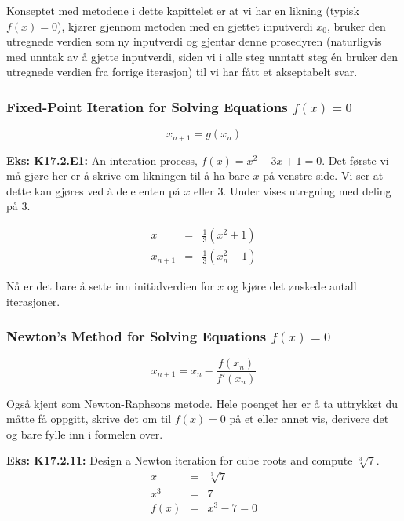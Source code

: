 \documentclass[norsk, a4paper, 12pt, titlepage]{article}
\begin{document}
Konseptet med metodene i dette kapittelet er at vi har en likning
(typisk $f(x) = 0$), kjører gjennom metoden med en gjettet inputverdi
$x_{0}$, bruker den utregnede verdien som ny inputverdi og gjentar
denne prosedyren (naturligvis med unntak av å gjette inputverdi, siden
vi i alle steg unntatt steg én bruker den utregnede verdien fra
forrige iterasjon) til vi har fått et akseptabelt svar.


\subsubsection{Fixed-Point Iteration for Solving Equations $f(x) = 0$}

\begin{equation}
x_{n+1} = g(x_{n})
\end{equation}

\textbf{Eks: K17.2.E1:} An interation process, $f(x) = x^{2} - 3x + 1
= 0$.
Det første vi må gjøre her er å skrive om likningen til å ha bare $x$
på venstre side.  Vi ser at dette kan gjøres ved å dele enten på $x$
eller 3.  Under vises utregning med deling på 3.

\begin{eqnarray*}
x & = & \frac{1}{3}(x^{2} + 1) \\
x_{n+1} & = & \frac{1}{3}(x_{n}^{2} + 1)
\end{eqnarray*}

Nå er det bare å sette inn initialverdien for $x$ og kjøre det ønskede
antall iterasjoner.


\subsubsection{Newton's Method for Solving Equations $f(x) = 0$}
\begin{equation}
x_{n+1} = x_{n} - \frac{f(x_{n})}{f'(x_{n})}
\end{equation}

Også kjent som Newton-Raphsons metode.  Hele poenget her er å ta
uttrykket du måtte få oppgitt, skrive det om til $f(x) = 0$ på et
eller annet vis, derivere det og bare fylle inn i formelen over.

\textbf{Eks: K17.2.11:} Design a Newton iteration for cube roots and
compute $\sqrt[3]{7}$.
\begin{eqnarray*}
x & = & \sqrt[3]{7} \\
x^{3} & = & 7 \\
f(x) & = & x^{3} - 7 = 0
\end{eqnarray*}
\end{document}
